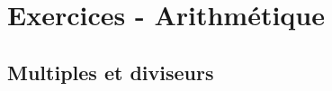 \section*{Exercices - Arithmétique}
{\setlength{\columnseprule}{0pt}
\setcounter{NumEx}{1}


\renewcommand{\arraystretch}{1.3}  %

\subsection*{Multiples et diviseurs}

\begin{Exercice}
\leavevmode\vspace{-\baselineskip}


\end{Exercice}}
